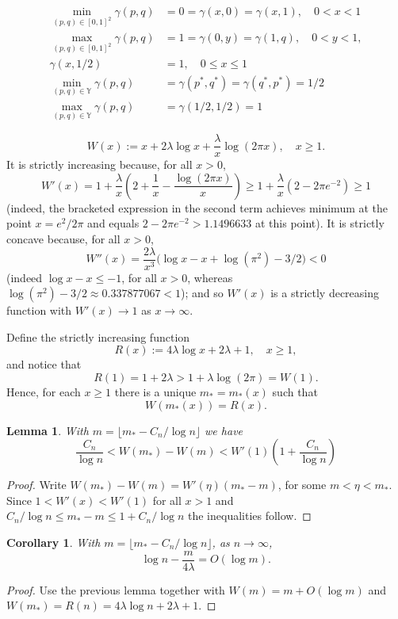 \documentclass[reqno]{amsart}
\theoremstyle{theorem}
\newtheorem{lemma}[theorem]{Lemma}
\newtheorem{corollary}[theorem]{Corollary}
\theoremstyle{definition}
\theoremstyle{remark}
\newcommand{\1}{{\text{\Large $\mathfrak 1$}}}	%
\numberwithin{equation}{section}
\def\Y{\mathbb{Y}}
\begin{document}
\begin{align*}
\min_{(p,q)\in [0,1]^2} \gamma(p,q) &= 0 = \gamma(x,0) = \gamma(x,1), \quad 0<x<1
\\
\max_{(p,q)\in [0,1]^2} \gamma(p,q) &= 1 = \gamma(0,y) = \gamma(1,q), \quad 0<y<1,
\\
\gamma(x,1/2) &=1 , \quad 0 \le x \le 1
\\
\min_{(p,q)\in \Y} \gamma(p,q) &= \gamma(p^*,q^*) = \gamma(q^*,p^*) = 1/2
\\
\max_{(p,q)\in \Y} \gamma(p,q) &= \gamma(1/2, 1/2)=1
\end{align*}


\[
W(x) := x+ 2\lambda \log x + \frac{\lambda}{x} \log(2\pi x), \quad x \ge 1.                
\]
It is strictly increasing because, for all $x>0$,
\[
W'(x) = 1+\frac{\lambda}{x}\left(2+\frac1x - \frac{\log(2\pi x)}{x}\right)                 
\ge 1+ \frac{\lambda}{x} (2-2\pi e^{-2}) \ge 1
\]
(indeed, the bracketed expression in the second term 
achieves minimum at the point $x=e^2/2\pi$ and
equals $2-2\pi{e^{-2}} > 1.1496633$ at this point).
It is strictly concave because, for all $x>0$,
\[
W''(x) = \frac{2\lambda}{x^3} \big(\log x-x + \log(\pi^2)-3/2\big) < 0
\]
(indeed $\log x-x \le -1$, for all $x>0$, whereas $\log(\pi^2)-3/2 
\approx 0.337877067 <1$); and so $W'(x)$ is a strictly decreasing function
with $W'(x)\to 1$ as $x \to \infty$.


Define the strictly increasing function
\[
R(x) :=4 \lambda \log x + 2 \lambda+1, \quad x \ge 1,
\]
and notice that
\[
R(1) = 1+2\lambda > 1+\lambda \log(2\pi) = W(1).
\]
Hence, for each $x \ge 1$ there is a unique $m_*=m_*(x)$ such that
\[
W(m_*(x)) = R(x).
\]

\begin{lemma}
\label{applem}
With $m=\lfloor m_* - C_n/\log n \rfloor$ we have
\[
\frac{C_n}{\log n} < W(m_*) - W(m) 
< W'(1) \left(1+\frac{C_n}{\log n}\right)
\]
\end{lemma}
\begin{proof}
Write $W(m_*) - W(m) = W'(\eta) (m_*-m)$, for some $m < \eta < m_*$.
Since $1 < W'(x) < W'(1)$ for all $x > 1$
and $C_n/\log n \le m_*-m \le 1+C_n/\log n$ the inequalities follow.
\end{proof}


\begin{corollary}
\label{coroA2}
With $m=\lfloor m_* - C_n/\log n \rfloor$,
as $n \to \infty$,
\[
\log n - \frac{m}{4\lambda} = O(\log m).
\]
\end{corollary}
\begin{proof}
Use the previous lemma together with  $W(m) = m + O(\log m)$
and $W(m_*) = R(n) = 4 \lambda \log n + 2\lambda +1$.
\end{proof}
\end{document}
